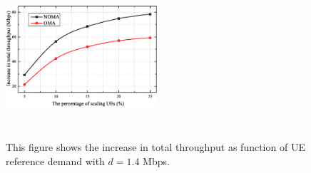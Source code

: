 \documentclass[10pt,journal,final,finalsubmission,twocolumn]{IEEEtran}
\begin{document}
\begin{figure}
\centering
\includegraphics[width=0.5\textwidth,height=6cm]{4.eps}
\caption{This figure shows the increase in total throughput as function of UE reference demand with $d = 1.4$ Mbps.}
\label{4}
\end{figure}
\end{document}

